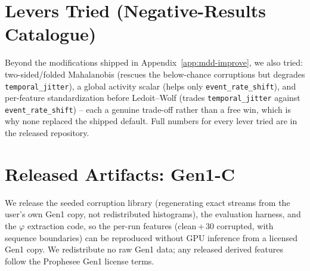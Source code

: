 ﻿\documentclass{article} %
\theoremstyle{remark}
\begin{document}
\section{Levers Tried (Negative-Results Catalogue)}
\label{app:levers}
Beyond the modifications shipped in Appendix~\ref{app:mdd-improve}, we also tried: two-sided/folded
Mahalanobis (rescues the below-chance corruptions but degrades \texttt{temporal\_jitter}), a global
activity scalar (helps only \texttt{event\_rate\_shift}), and per-feature standardization before
Ledoit--Wolf (trades \texttt{temporal\_jitter} against \texttt{event\_rate\_shift}) -- each a genuine
trade-off rather than a free win, which is why none replaced the shipped default. Full numbers for
every lever tried are in the released repository.

\section{Released Artifacts: Gen1-C}
\label{app:gen1c}
We release the seeded corruption library (regenerating exact streams from the user's own Gen1 copy,
not redistributed histograms), the evaluation harness, and the $\varphi$ extraction code, so the
per-run features (clean\,+\,30 corrupted, with sequence boundaries) can be reproduced without GPU
inference from a licensed Gen1 copy. We redistribute no raw Gen1 data; any released derived features
follow the Prophesee Gen1 license terms.
\end{document}
